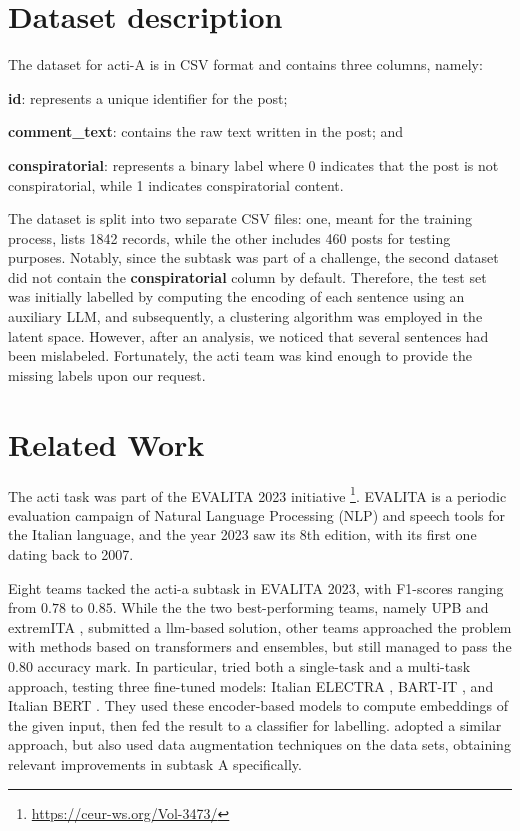 \documentclass[11pt]{article}
\begin{document}
\section{Dataset description}\label{sec:dataset-description}
The dataset for \ac{acti}-A is in CSV format and contains three columns, namely:
\begin{enumerate*}[label=(\roman*)]
  \item \textbf{id}: represents a unique identifier for the post;
  \item \textbf{comment\_text}: contains the raw text written in the post; and
  \item \textbf{conspiratorial}: represents a binary label where 0 indicates that the post is not conspiratorial,
    while 1 indicates conspiratorial content.
\end{enumerate*}
The dataset is split into two separate CSV files: one, meant for the training process, lists
1842 records, while the other includes 460 posts for testing purposes.
%
Notably, since the subtask was part of a challenge, the second dataset did not contain the
\textbf{conspiratorial} column by default.
%
Therefore, the test set was initially labelled by computing the encoding of each sentence using an auxiliary LLM,
and subsequently, a clustering algorithm was employed in the latent space.
%
However, after an analysis, we noticed that several sentences had been mislabeled.
%
Fortunately, the \ac{acti} team was kind enough to provide the
missing labels upon our request.

\section{Related Work}\label{sec:related-work}

The \ac{acti} task \cite{russo2023actievalita2023overview} was part of the EVALITA 2023 initiative
\cite{lai2023evalita} \footnote{\url{https://ceur-ws.org/Vol-3473/}}. EVALITA is a periodic evaluation campaign
of Natural Language Processing (NLP) and speech tools for the Italian language, and the year 2023 saw its 8th
edition, with its first one dating back to 2007.

Eight teams tacked the \ac{acti}-a subtask in EVALITA 2023, with F1-scores ranging from $0.78$ to $0.85$. While
the the two best-performing teams, namely UPB \cite{paraschiv2023upbactidetecting} and extremITA
\cite{hromei2023extremita}, submitted a \ac{llm}-based solution, other teams approached the problem with methods
based on transformers and ensembles, but still managed to pass the $0.80$ accuracy mark. In particular,
\cite{giobergia2023acti} tried both a single-task and a multi-task approach, testing three fine-tuned models:
Italian ELECTRA \cite{9514855}, BART-IT \cite{fi15010015}, and Italian BERT \cite{stefan-it-italian-bertelectra}.
They used these encoder-based models to compute embeddings of the given input, then fed the result to a classifier
for labelling. \cite{vitali2023acti} adopted a similar approach, but also used data augmentation techniques on the
data sets, obtaining relevant improvements in subtask A specifically.
\end{document}
